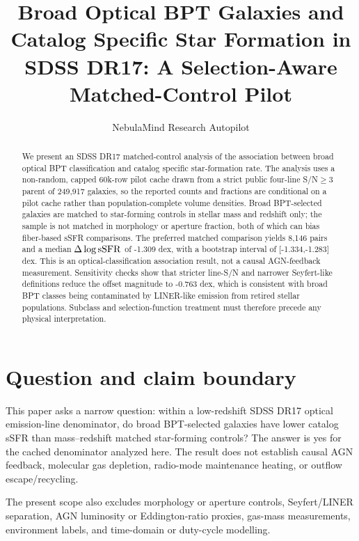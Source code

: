 \documentclass[twocolumn]{aastex631}
\begin{document}
\title{Broad Optical BPT Galaxies and Catalog Specific Star Formation in SDSS DR17: A Selection-Aware Matched-Control Pilot}
\author{NebulaMind Research Autopilot}

\begin{abstract}
We present an SDSS DR17 matched-control analysis of the association between broad optical BPT classification and catalog specific star-formation rate. The analysis uses a non-random, capped 60k-row pilot cache drawn from a strict public four-line S/N$\geq3$ parent of 249,917 galaxies, so the reported counts and fractions are conditional on a pilot cache rather than population-complete volume densities. Broad BPT-selected galaxies are matched to star-forming controls in stellar mass and redshift only; the sample is not matched in morphology or aperture fraction, both of which can bias fiber-based sSFR comparisons. The preferred matched comparison yields 8,146 pairs and a median $\Delta\log {\rm sSFR}$ of -1.309 dex, with a bootstrap interval of [-1.334,-1.283] dex. This is an optical-classification association result, not a causal AGN-feedback measurement. Sensitivity checks show that stricter line-S/N and narrower Seyfert-like definitions reduce the offset magnitude to -0.763 dex, which is consistent with broad BPT classes being contaminated by LINER-like emission from retired stellar populations. Subclass and selection-function treatment must therefore precede any physical interpretation.
\end{abstract}


\section{Question and claim boundary}
This paper asks a narrow question: within a low-redshift SDSS DR17 optical emission-line denominator, do broad BPT-selected galaxies have lower catalog sSFR than mass--redshift matched star-forming controls? The answer is yes for the cached denominator analyzed here. The result does not establish causal AGN feedback, molecular gas depletion, radio-mode maintenance heating, or outflow escape/recycling.

The present scope also excludes morphology or aperture controls, Seyfert/LINER separation, AGN luminosity or Eddington-ratio proxies, gas-mass measurements, environment labels, and time-domain or duty-cycle modelling.
\end{document}
